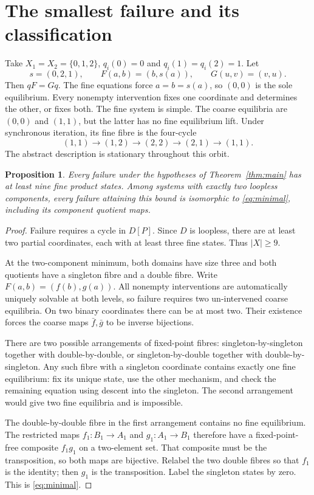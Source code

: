 \documentclass[11pt,a4paper]{article}
\newtheorem{proposition}[theorem]{Proposition}
\theoremstyle{definition}
\theoremstyle{remark}
\begin{document}
\section{The smallest failure and its classification}

Take $X_1=X_2=\{0,1,2\}$, $q_i(0)=0$ and $q_i(1)=q_i(2)=1$. Let
\begin{equation}\label{eq:minimal}
 s=(0,2,1),\qquad F(a,b)=(b,s(a)),\qquad G(u,v)=(v,u).
\end{equation}
Then $qF=Gq$. The fine equations force $a=b=s(a)$, so $(0,0)$ is the sole equilibrium. Every nonempty intervention fixes one coordinate and determines the other, or fixes both. The fine system is simple. The coarse equilibria are $(0,0)$ and $(1,1)$, but the latter has no fine equilibrium lift. Under synchronous iteration, its fine fibre is the four-cycle
\[
 (1,1)\longrightarrow(1,2)\longrightarrow(2,2)
 \longrightarrow(2,1)\longrightarrow(1,1).
\]
The abstract description is stationary throughout this orbit.

\begin{proposition}\label{prop:minimal}
Every failure under the hypotheses of Theorem~\ref{thm:main} has at least nine fine product states. Among systems with exactly two loopless components, every failure attaining this bound is isomorphic to \eqref{eq:minimal}, including its component quotient maps.
\end{proposition}
\begin{proof}
Failure requires a cycle in $D[P]$. Since $D$ is loopless, there are at least two partial coordinates, each with at least three fine states. Thus $|X|\ge9$.

At the two-component minimum, both domains have size three and both quotients have a singleton fibre and a double fibre. Write $F(a,b)=(f(b),g(a))$. All nonempty interventions are automatically uniquely solvable at both levels, so failure requires two un-intervened coarse equilibria. On two binary coordinates there can be at most two. Their existence forces the coarse maps $\bar f,\bar g$ to be inverse bijections.

There are two possible arrangements of fixed-point fibres: singleton-by-singleton together with double-by-double, or singleton-by-double together with double-by-singleton. Any such fibre with a singleton coordinate contains exactly one fine equilibrium: fix its unique state, use the other mechanism, and check the remaining equation using descent into the singleton. The second arrangement would give two fine equilibria and is impossible.

The double-by-double fibre in the first arrangement contains no fine equilibrium. The restricted maps $f_1:B_1\to A_1$ and $g_1:A_1\to B_1$ therefore have a fixed-point-free composite $f_1g_1$ on a two-element set. That composite must be the transposition, so both maps are bijective. Relabel the two double fibres so that $f_1$ is the identity; then $g_1$ is the transposition. Label the singleton states by zero. This is \eqref{eq:minimal}.
\end{proof}
\end{document}
